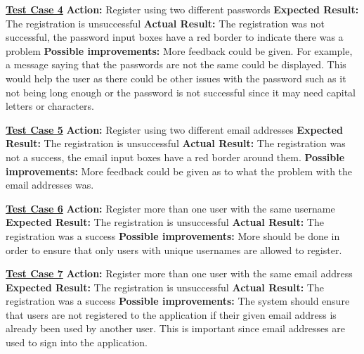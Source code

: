 \documentclass[english]{article}
\begin{document}
\textbf{\underline{Test Case 4}}\newline
\textbf{Action:} Register using two different passwords\newline
\textbf{Expected Result:} The registration is unsuccessful\newline
\textbf{Actual Result:} The registration was not successful, the password input boxes have a red border to indicate there was a problem \newline
\textbf{Possible improvements:} More feedback could be given. For example, a message saying that the passwords are not the same could be displayed. This would help the user as there could be other issues with the password such as it not being long enough or the password is not successful since it may need capital letters or characters.\newline

\textbf{\underline{Test Case 5}}\newline
\textbf{Action:} Register using two different email addresses\newline
\textbf{Expected Result:} The registration is unsuccessful\newline
\textbf{Actual Result:} The registration was not a success, the email input boxes have a red border around them.\newline
\textbf{Possible improvements:} More feedback could be given as to what the problem with the email addresses was.\newline

\textbf{\underline{Test Case 6}}\newline
\textbf{Action:} Register more than one user with the same username\newline
\textbf{Expected Result:} The registration is unsuccessful\newline
\textbf{Actual Result:} The registration was a success\newline
\textbf{Possible improvements:} More should be done in order to ensure that only users with unique usernames are allowed to register.\newline

\textbf{\underline{Test Case 7}}\newline
\textbf{Action:} Register more than one user with the same email address\newline
\textbf{Expected Result:} The registration is unsuccessful\newline
\textbf{Actual Result:} The registration was a success\newline
\textbf{Possible improvements:} The system should ensure that users are not registered to the application if their given email address is already been used by another user. This is important since email addresses are used to sign into the application.\newline\newline
\end{document}
